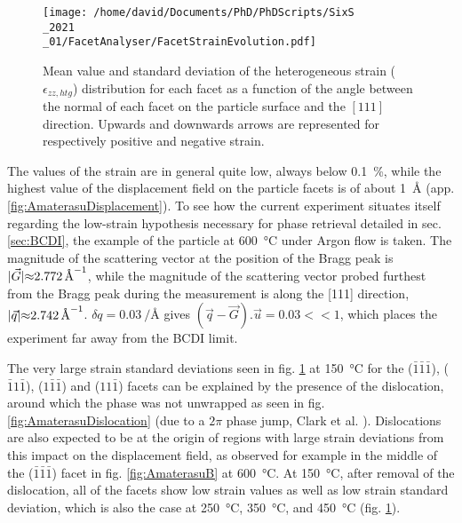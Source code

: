 \begin{figure}[!htb]
    \centering
    \texttt{[image: /home/david/Documents/PhD/PhDScripts/SixS\\\_2021\\\_01/FacetAnalyser/FacetStrainEvolution.pdf]}
    \caption{
        Mean value and standard deviation of the heterogeneous strain ($\epsilon_{zz, htg}$) distribution for each facet as a function of the angle between the normal of each facet on the particle surface and the $[111]$ direction.
        Upwards and downwards arrows are represented for respectively positive and negative strain.
    }
    \label{fig:AmaterasuStrain}
\end{figure}

The values of the strain are in general quite low, always below \qty{0.1}{\percent}, while the highest value of the displacement field on the particle facets is of about \qty{1}{\angstrom} (app. \ref{fig:AmaterasuDisplacement}).
To see how the current experiment situates itself regarding the low-strain hypothesis necessary for phase retrieval detailed in sec. \ref{sec:BCDI}, the example of the particle at \qty{600}{\degreeCelsius} under Argon flow is taken.
The magnitude of the scattering vector at the position of the Bragg peak is $|\vec{G}| \qty{\approx 2.772}{\per\angstrom}$, while the magnitude of the scattering vector probed furthest from the Bragg peak during the measurement is along the [111] direction, $|\vec{q}| \qty{\approx 2.742}{\per\angstrom}$.
$\delta q = \qty{0.03}{\per\angstrom}$ gives $(\vec{q}-\vec{G}).\vec{u} = 0.03 <<1$, which places the experiment far away from the BCDI limit.

The very large strain standard deviations seen in fig. \ref{fig:AmaterasuStrain} at \qty{150}{\degreeCelsius} for the ($\bar{1}\bar{1}\bar{1}$), ($\bar{1}1\bar{1}$), ($1\bar{1}\bar{1}$) and ($11\bar{1}$) facets can be explained by the presence of the dislocation, around which the phase was not unwrapped as seen in fig. \ref{fig:AmaterasuDislocation} (due to a $2\pi$ phase jump, Clark et al. \cite*{Clark2015}).
Dislocations are also expected to be at the origin of regions with large strain deviations from this impact on the displacement field, as observed for example in the middle of the ($\bar{1}\bar{1}\bar{1}$) facet in fig. \ref{fig:AmaterasuB} at \qty{600}{\degreeCelsius}.
At \qty{150}{\degreeCelsius}, after removal of the dislocation, all of the facets show low strain values as well as low strain standard deviation, which is also the case at \qty{250}{\degreeCelsius}, \qty{350}{\degreeCelsius}, and \qty{450}{\degreeCelsius} (fig. \ref{fig:AmaterasuStrain}).

